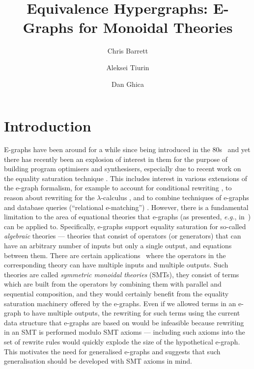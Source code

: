 \documentclass[sigconf, 9pt, nonacm]{acmart}
\begin{document}
\title{Equivalence Hypergraphs: E-Graphs for Monoidal Theories}

\author{Chris Barrett}

\author{Aleksei Tiurin}

\author{Dan Ghica}

\maketitle

\section{Introduction}

E-graphs have been around for a while since being introduced in the 80s~\cite{nelson1980techniques} and yet there has recently been an explosion of interest in them for the purpose of building program optimisers and synthesisers, especially due to recent work on the equality saturation technique \cite{10.1145/1594834.1480915, griggio_proceedings_2022, EggPaper,flatt_small_2022}.
This includes interest in various extensions of the e-graph formalism, for example to account for conditional rewriting \cite{singher2023colored},  to reason about rewriting for the $\lambda$-calculus \cite{koehler2022sketchguided},  and to combine techniques of e-graphs and database queries (``relational e-matching'') \cite{zhang_relational_2022}.
However, there is a fundamental limitation to the area of equational theories that e-graphs (as presented, \textit{e.g.}, in~\cite{EggPaper}) can be applied to.
Specifically, e-graphs support equality saturation for so-called \textit{algebraic} theories --- theories that consist of operators (or generators) that can have an arbitrary number of inputs but only a single output, and equations between them.
There are certain applications~\cite{zx, ghica_compositional_2023, probabilistic} where the operators in the corresponding theory can have multiple inputs and multiple outputs. 
Such theories are called \textit{symmetric monoidal theories} (SMTs), they consist of terms which are built from the operators by combining them with parallel and sequential composition, and they would certainly benefit from the equality saturation machinery offered by the e-graphs.
Even if we allowed terms in an e-graph to have multiple outputs, the rewriting for such terms using the current data structure that e-graphs are based on would be infeasible because rewriting in an SMT is performed modulo SMT axioms --- including such axioms into the set of rewrite rules would quickly explode the size of the hypothetical e-graph.
This motivates the need for generalised e-graphs and suggests that such generalisation should be developed with SMT axioms in mind.
\end{document}
